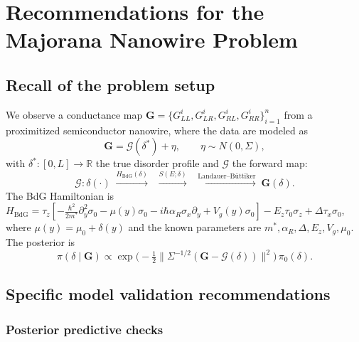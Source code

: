 \documentclass[11pt]{article}
\newcommand{\R}{\mathbb{R}}
\newcommand{\cG}{\mathcal{G}}
\theoremstyle{plain}
\theoremstyle{remark}
\theoremstyle{definition}
\begin{document}
\section{Recommendations for the Majorana Nanowire Problem}\label{sec:recs}

\subsection{Recall of the problem setup}

We observe a conductance map 
$\mathbf{G} = \{G_{LL}^i, G_{LR}^i, G_{RL}^i, G_{RR}^i\}_{i=1}^n$ from 
a proximitized semiconductor nanowire, where the data are modeled as
\begin{equation}\label{eq:our_model}
\mathbf{G} = \cG(\delta^*) + \eta, \qquad \eta \sim N(0, \Sigma),
\end{equation}
with $\delta^*: [0, L] \to \R$ the true disorder profile and $\cG$ the 
forward map:
\[
\cG: \delta(\cdot) 
\;\xrightarrow{H_{\mathrm{BdG}}(\delta)}\; 
\;\xrightarrow{S(E;\delta)}\;
\;\xrightarrow{\text{Landauer--B\"uttiker}}\;
\mathbf{G}(\delta).
\]
The BdG Hamiltonian is 
$H_{\mathrm{BdG}} = \tau_z[-\frac{\hbar^2}{2m^*}\partial_y^2\sigma_0 
- \mu(y)\sigma_0 - i\hbar\alpha_R\sigma_x\partial_y + V_g(y)\sigma_0] 
- E_z\tau_0\sigma_z + \Delta\tau_x\sigma_0$,
where $\mu(y) = \mu_0 + \delta(y)$ and the known parameters are 
$m^*, \alpha_R, \Delta, E_z, V_g, \mu_0$. The posterior is
\[
\pi(\delta \mid \mathbf{G}) \propto 
\exp\bigl(-\tfrac{1}{2}\|\Sigma^{-1/2}(\mathbf{G} - \cG(\delta))\|^2\bigr)
\,\pi_0(\delta).
\]

\subsection{Specific model validation recommendations}

\subsubsection{Posterior predictive checks}
\end{document}
